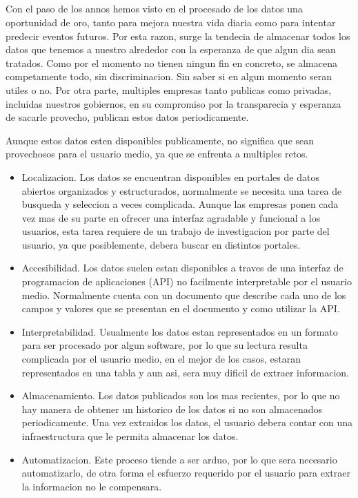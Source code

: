 \subsection*{}
Con el paso de los annos hemos visto en el procesado de los datos una oportunidad de oro, 
tanto para mejora nuestra vida diaria como para intentar predecir
eventos futuros. Por esta razon, surge la tendecia de almacenar todos los datos que tenemos 
a nuestro alrededor con la esperanza de que algun dia sean tratados.
Como por el momento no tienen ningun fin en concreto, se almacena competamente todo, sin discriminacion.
Sin saber si en algun momento seran utiles o no.
Por otra parte, multiples empresas tanto publicas como privadas, incluidas nuestros gobiernos, 
en su compromiso por la transparecia y esperanza de sacarle provecho, publican estos datos periodicamente.

Aunque estos datos esten disponibles publicamente, no significa que sean provechosos para el 
usuario medio, ya que se enfrenta a multiples retos.
\begin{itemize}
    \item Localizacion. Los datos se encuentran disponibles en portales de datos abiertos organizados 
    y estructurados, normalmente se necesita una tarea de busqueda y seleccion
    a veces complicada. Aunque las empresas ponen cada vez mas de su parte en ofrecer una interfaz 
    agradable y funcional a los usuarios, esta tarea requiere de un trabajo de investigacion por parte del usuario,
    ya que posiblemente, debera buscar en distintos portales.
    \item Accesibilidad. Los datos suelen estan disponibles a traves de una interfaz de programacion 
    de aplicaciones (API) no facilmente interpretable por el usuario medio. Normalmente cuenta con 
    un documento que describe cada uno de los campos y valores que se presentan en el documento y como utilizar la API.
    \item Interpretabilidad. Usualmente los datos estan representados en un formato para ser procesado por 
    algun software, por lo que su lectura resulta complicada por el usuario medio, en el mejor de los casos, 
    estaran representados en una tabla y aun asi, sera muy dificil de extraer informacion.
    \item Almacenamiento. Los datos publicados son los mas recientes, por lo que no hay manera de obtener 
    un historico de los datos si no son almacenados periodicamente. Una vez extraidos los datos, el usuario debera 
    contar con una infraestructura que le permita almacenar los datos.
    \item Automatizacion. Este proceso tiende a ser arduo, por lo que sera necesario automatizarlo, de otra 
    forma el esfuerzo requerido por el usuario para extraer la informacion no le compensara.
     
\end{itemize}


